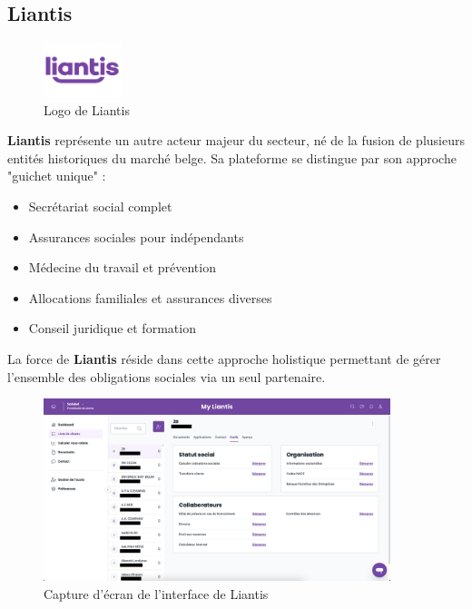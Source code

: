 \newpage
\subsection{Liantis}

\begin{figure}[H]
    \centering
    \includegraphics[width=0.2\textwidth]{liantisLogo.png}
    \caption{Logo de Liantis \cite{liantis}}
    \label{fig:liantisLogo}
\end{figure}

\noindent \textbf{Liantis} représente un autre acteur majeur du secteur, né de la fusion de plusieurs entités historiques du marché belge. Sa plateforme se distingue par son approche "guichet unique" :

\begin{itemize}[leftmargin=*,label=\textcolor{darkgray}{$\bullet$},itemsep=0.3em]
  \item Secrétariat social complet
  \item Assurances sociales pour indépendants
  \item Médecine du travail et prévention
  \item Allocations familiales et assurances diverses
  \item Conseil juridique et formation
\end{itemize}

\noindent La force de \textbf{Liantis} réside dans cette approche holistique permettant de gérer l'ensemble des obligations sociales via un seul partenaire.

\begin{figure}[H]
    \centering
    \includegraphics[width=0.9\textwidth]{liantisScreenshot.png}
    \caption{Capture d'écran de l'interface de Liantis \cite{liantis}}
    \label{fig:liantisScreenshot}
\end{figure}

